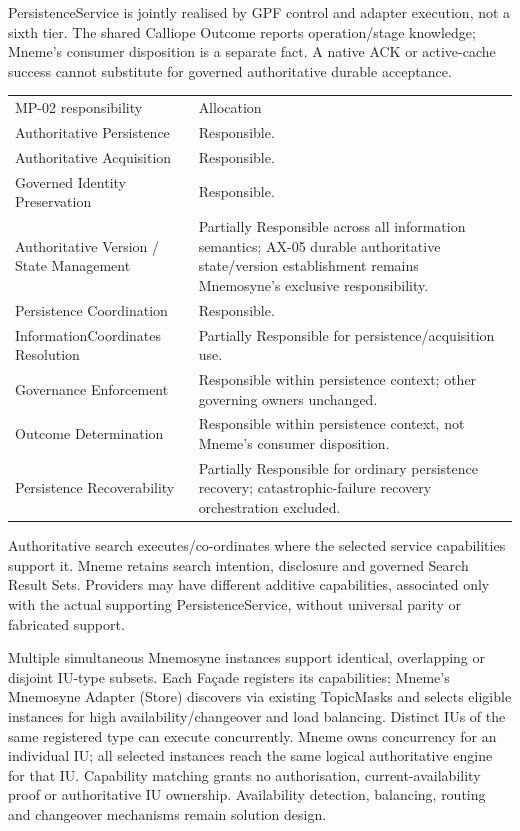 PersistenceService is jointly realised by GPF control and adapter execution, not a sixth tier. The shared Calliope Outcome reports operation/stage knowledge; Mneme’s consumer disposition is a separate fact. A native ACK or active-cache success cannot substitute for governed authoritative durable acceptance.



\begin{longtable}{>{\raggedright\arraybackslash}p{}>{\raggedright\arraybackslash}p{}}
MP-02 responsibility & Allocation \\
Authoritative Persistence & Responsible. \\
Authoritative Acquisition & Responsible. \\
Governed Identity Preservation & Responsible. \\
Authoritative Version / State Management & Partially Responsible across all information semantics; AX-05 durable authoritative state/version establishment remains Mnemosyne’s exclusive responsibility. \\
Persistence Coordination & Responsible. \\
InformationCoordinates Resolution & Partially Responsible for persistence/acquisition use. \\
Governance Enforcement & Responsible within persistence context; other governing owners unchanged. \\
Outcome Determination & Responsible within persistence context, not Mneme’s consumer disposition. \\
Persistence Recoverability & Partially Responsible for ordinary persistence recovery; catastrophic-failure recovery orchestration excluded. \\
\end{longtable}


Authoritative search executes/co-ordinates where the selected service capabilities support it. Mneme retains search intention, disclosure and governed Search Result Sets. Providers may have different additive capabilities, associated only with the actual supporting PersistenceService, without universal parity or fabricated support.



Multiple simultaneous Mnemosyne instances support identical, overlapping or disjoint IU-type subsets. Each Façade registers its capabilities; Mneme’s Mnemosyne Adapter (Store) discovers via existing TopicMasks and selects eligible instances for high availability/changeover and load balancing. Distinct IUs of the same registered type can execute concurrently. Mneme owns concurrency for an individual IU; all selected instances reach the same logical authoritative engine for that IU. Capability matching grants no authorisation, current-availability proof or authoritative IU ownership. Availability detection, balancing, routing and changeover mechanisms remain solution design.



